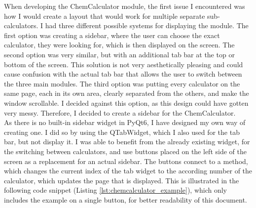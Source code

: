 \documentclass[a4paper,12pt]{article}
\begin{document}
When developing the ChemCalculator module, the first issue I encountered was how I would create a layout that would work for multiple separate sub-calculators. I had three different possible systems for displaying the module. The first option was creating a sidebar, where the user can choose the exact calculator, they were looking for, which is then displayed on the screen. The second option was very similar, but with an additional tab bar at the top or bottom of the screen. This solution is not very aesthetically pleasing and could cause confusion with the actual tab bar that allows the user to switch between the three main modules. The third option was putting every calculator on the same page, each in its own area, clearly separated from the others, and make the window scrollable. I decided against this option, as this design could have gotten very messy. Therefore, I decided to create a sidebar for the ChemCalculator. \\
As there is no built-in sidebar widget in PyQt6, I have designed my own way of creating one. I did so by using the QTabWidget, which I also used for the tab bar, but not display it. I was able to benefit from the already existing widget, for the switching between calculators, and use buttons placed on the left side of the screen as a replacement for an actual sidebar. The buttons connect to a method, which changes the current index of the tab widget to the according number of the calculator, which updates the page that is displayed. This is illustrated in the following code snippet (Listing \ref{lst:chemcalculator_example}), which only includes the example on a single button, for better readability of this document.
\end{document}
